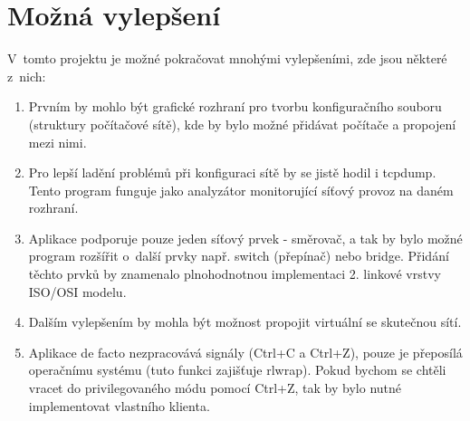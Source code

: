 \chapter{Možná vylepšení}

V~tomto projektu je možné pokračovat mnohými vylepšeními, zde jsou některé z~nich:

\begin{enumerate}
\item Prvním by mohlo být grafické rozhraní pro tvorbu konfiguračního souboru (struktury počítačové sítě), kde by bylo možné přidávat počítače a propojení mezi nimi.                                                                                                                                                                     

\item Pro lepší ladění problémů při konfiguraci sítě by se jistě hodil i tcpdump. Tento program funguje jako analyzátor monitorující síťový provoz na daném rozhraní.

\item Aplikace podporuje pouze jeden síťový prvek - směrovač, a tak by bylo možné program rozšířit o~další prvky např. switch (přepínač) nebo bridge. Přidání těchto prvků by znamenalo plnohodnotnou implementaci 2. linkové vrstvy ISO/OSI modelu.

\item Dalším vylepšením by mohla být možnost propojit virtuální se skutečnou sítí. 

\item Aplikace de facto nezpracovává signály (Ctrl+C a Ctrl+Z), pouze je přeposílá operačnímu systému (tuto funkci zajišťuje rlwrap). Pokud bychom se chtěli vracet do privilegovaného módu pomocí Ctrl+Z, tak by bylo nutné implementovat vlastního klienta.
\end{enumerate}









